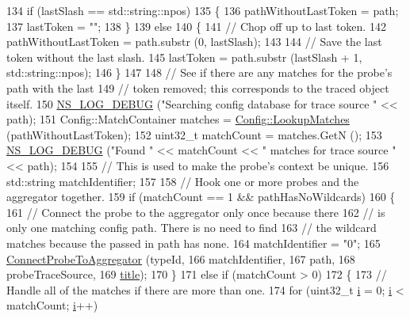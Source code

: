 \begin{DoxyCode}
134   \textcolor{keywordflow}{if} (lastSlash == std::string::npos)
135     \{
136       pathWithoutLastToken = path;
137       lastToken = \textcolor{stringliteral}{""};
138     \}
139   \textcolor{keywordflow}{else}
140     \{
141       \textcolor{comment}{// Chop off up to last token.}
142       pathWithoutLastToken = path.substr (0, lastSlash);
143 
144       \textcolor{comment}{// Save the last token without the last slash.}
145       lastToken = path.substr (lastSlash + 1, std::string::npos);
146     \}
147 
148   \textcolor{comment}{// See if there are any matches for the probe's path with the last}
149   \textcolor{comment}{// token removed; this corresponds to the traced object itself.}
150   \hyperlink{group__logging_ga413f1886406d49f59a6a0a89b77b4d0a}{NS\_LOG\_DEBUG} (\textcolor{stringliteral}{"Searching config database for trace source "} << path);
151   Config::MatchContainer matches = \hyperlink{group__config_ga74aeb63f8f50b4a98043351552ef7db6}{Config::LookupMatches} (pathWithoutLastToken);
152   uint32\_t matchCount = matches.GetN ();
153   \hyperlink{group__logging_ga413f1886406d49f59a6a0a89b77b4d0a}{NS\_LOG\_DEBUG} (\textcolor{stringliteral}{"Found "} << matchCount << \textcolor{stringliteral}{" matches for trace source "} << path);
154 
155   \textcolor{comment}{// This is used to make the probe's context be unique.}
156   std::string matchIdentifier;
157 
158   \textcolor{comment}{// Hook one or more probes and the aggregator together.}
159   \textcolor{keywordflow}{if} (matchCount == 1 && pathHasNoWildcards)
160     \{
161       \textcolor{comment}{// Connect the probe to the aggregator only once because there}
162       \textcolor{comment}{// is only one matching config path.  There is no need to find}
163       \textcolor{comment}{// the wildcard matches because the passed in path has none.}
164       matchIdentifier = \textcolor{stringliteral}{"0"};
165       \hyperlink{classns3_1_1GnuplotHelper_ad80ba9cf7fe4c4c5fc9c165d7d04955d}{ConnectProbeToAggregator} (typeId,
166                                 matchIdentifier,
167                                 path,
168                                 probeTraceSource,
169                                 \hyperlink{lte__link__budget_8m_a5b09b57ee35b13a452f0c089c0709f8b}{title});
170     \}
171   \textcolor{keywordflow}{else} \textcolor{keywordflow}{if} (matchCount > 0)
172     \{
173       \textcolor{comment}{// Handle all of the matches if there are more than one.}
174       \textcolor{keywordflow}{for} (uint32\_t \hyperlink{bernuolliDistribution_8m_a6f6ccfcf58b31cb6412107d9d5281426}{i} = 0; \hyperlink{bernuolliDistribution_8m_a6f6ccfcf58b31cb6412107d9d5281426}{i} < matchCount; \hyperlink{bernuolliDistribution_8m_a6f6ccfcf58b31cb6412107d9d5281426}{i}++)

\end{DoxyCode}

